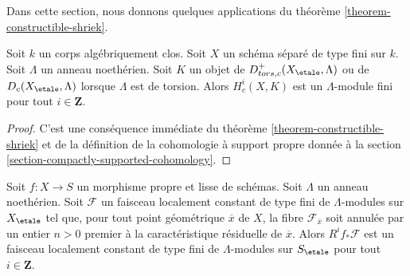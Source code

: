 \noindent
Dans cette section, nous donnons quelques applications du
théorème \ref{theorem-constructible-shriek}.

\begin{lemma}
\label{lemma-finiteness-compactly-supported}
Soit $k$ un corps algébriquement clos.
Soit $X$ un schéma séparé de type fini sur $k$.
Soit $\Lambda$ un anneau noethérien. Soit $K$ un objet de
$D^+_{tors, c}(X_\etale, \Lambda)$ ou de $D_c(X_\etale, \Lambda)$
lorsque $\Lambda$ est de torsion. Alors
$H^i_c(X, K)$ est un $\Lambda$-module fini pour tout
$i \in \mathbf{Z}$.
\end{lemma}

\begin{proof}
C'est une conséquence immédiate du théorème \ref{theorem-constructible-shriek}
et de la définition de la cohomologie à support propre donnée à la
section \ref{section-compactly-supported-cohomology}.
\end{proof}

\begin{proposition}
\label{proposition-loc-cst-torsion}
Soit $f : X \to S$ un morphisme propre et lisse de schémas.
Soit $\Lambda$ un anneau noethérien. Soit $\mathcal{F}$ un
faisceau localement constant de type fini de $\Lambda$-modules
sur $X_\etale$ tel que, pour tout point géométrique $\overline{x}$ de $X$,
la fibre $\mathcal{F}_{\overline{x}}$ soit annulée par un entier
$n > 0$ premier à la caractéristique résiduelle de $\overline{x}$.
Alors $R^if_*\mathcal{F}$ est un faisceau localement constant de type fini de
$\Lambda$-modules sur $S_\etale$ pour tout $i \in \mathbf{Z}$.
\end{proposition}


